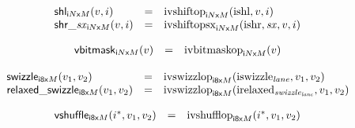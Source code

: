 $$
\begin{array}[t]{@{}lcl@{}l@{}}
{\mathsf{shl}}{{}_{{{\mathsf{i}}{N}}{\mathsf{x}}{M}}}{(v, i)} & = & {{\mathrm{ivshiftop}}}_{{{\mathsf{i}}{N}}{\mathsf{x}}{M}}({\mathrm{ishl}}, v, i) \\
{{\mathsf{shr}}{\mathsf{\_}}{{\mathit{sx}}}}{{}_{{{\mathsf{i}}{N}}{\mathsf{x}}{M}}}{(v, i)} & = & {{\mathrm{ivshiftopsx}}}_{{{\mathsf{i}}{N}}{\mathsf{x}}{M}}({\mathrm{ishr}}, {\mathit{sx}}, v, i) \\
\end{array}
$$

$$
\begin{array}[t]{@{}lcl@{}l@{}}
{\mathsf{vbitmask}}{{}_{{{\mathsf{i}}{N}}{\mathsf{x}}{M}}(v)} & = & {{\mathrm{ivbitmaskop}}}_{{{\mathsf{i}}{N}}{\mathsf{x}}{M}}(v) \\
\end{array}
$$

$$
\begin{array}[t]{@{}lcl@{}l@{}}
{\mathsf{swizzle}}{{}_{{\mathsf{i{\scriptstyle 8}}}{\mathsf{x}}{M}}(v_1, v_2)} & = & {{\mathrm{ivswizzlop}}}_{{\mathsf{i{\scriptstyle 8}}}{\mathsf{x}}{M}}({\mathrm{iswizzle}}_{{\mathit{lane}}}, v_1, v_2) \\
{\mathsf{relaxed\_swizzle}}{{}_{{\mathsf{i{\scriptstyle 8}}}{\mathsf{x}}{M}}(v_1, v_2)} & = & {{\mathrm{ivswizzlop}}}_{{\mathsf{i{\scriptstyle 8}}}{\mathsf{x}}{M}}({\mathrm{irelaxed}}_{{\mathit{swizzle}}_{{\mathit{lane}}}}, v_1, v_2) \\
\end{array}
$$

$$
\begin{array}[t]{@{}lcl@{}l@{}}
{\mathsf{vshuffle}}{{}_{{\mathsf{i{\scriptstyle 8}}}{\mathsf{x}}{M}}({i^\ast}, v_1, v_2)} & = & {{\mathrm{ivshufflop}}}_{{\mathsf{i{\scriptstyle 8}}}{\mathsf{x}}{M}}({i^\ast}, v_1, v_2) \\
\end{array}
$$

